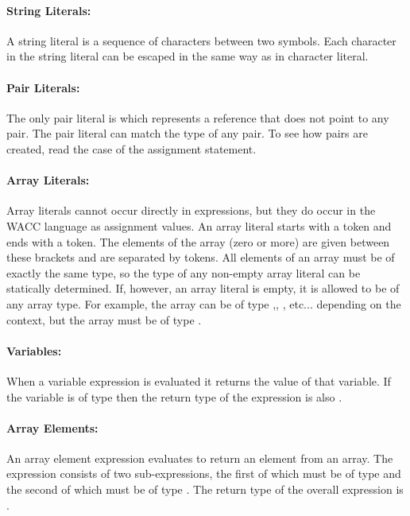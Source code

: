 \documentclass[a4paper]{article}
\theoremstyle{definition}
\begin{document}
\paragraph{String Literals:}
A string literal  is a sequence of characters between two  symbols.
Each character in the string literal can be escaped in the same way as in character literal.

\paragraph{Pair Literals:}
The only pair literal  is  which represents a reference that does not point to any pair. The  pair literal can match the type of any pair.
To see how pairs are created, read the  case of the assignment statement.

\paragraph{Array Literals:} Array literals cannot occur directly in expressions, but they do occur in the WACC language as assignment values.
An array literal starts with a \lit{[} token and ends with a \lit{]} token.
The elements of the array (zero or more) are given between these brackets and are separated by \lit{,} tokens.
All elements of an array must be of exactly the same type, so the type of any non-empty array literal can be statically determined.
If, however, an array literal is empty, it is allowed to be of any array type.
For example, the array \lit{[]} can be of type ,, , etc... depending on the context, but the array \lit{[1]} must be of type .

\paragraph{Variables:}
When a variable expression  is evaluated it returns the value of that variable.
If the variable is of type  then the return type of the expression is also .

\paragraph{Array Elements:}
An array element expression evaluates to return an element from an array.
The expression consists of two sub-expressions, the first of which must be of type  and the second of which must be of type .
The return type of the overall expression is .
\end{document}
